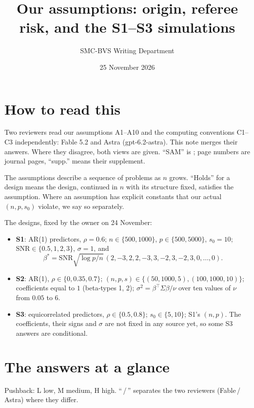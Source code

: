 \documentclass[11pt]{article}
\title{Our assumptions: origin, referee risk, and the S1--S3 simulations}
\author{SMC-BVS Writing Department}
\date{25 November 2026}
\newcommand{\sz}{s_0}
\begin{document}
\maketitle

\section*{How to read this}
Two reviewers read our assumptions A1--A10 and the computing conventions C1--C3 independently: Fable 5.2 and Astra
(gpt-6.2-astra). This note merges their answers. Where they disagree, both views are given. ``SAM'' is
\citet{SongLiang2015}; page numbers are journal pages, ``supp.'' means their supplement.

The assumptions describe a sequence of problems as $n$ grows. ``Holds'' for a design means the design, continued in $n$
with its structure fixed, satisfies the assumption. Where an assumption has explicit constants that our actual $(n,p,\sz)$
violate, we say so separately.

The designs, fixed by the owner on 24 November:
\begin{itemize}
  \item \textbf{S1}: AR(1) predictors, $\rho=0.6$; $n\in\{500,1000\}$, $p\in\{500,5000\}$, $\sz=10$;
    $\mathrm{SNR}\in\{0.5,1,2,3\}$, $\sigma=1$, and
    \[\beta^*=\mathrm{SNR}\sqrt{\log p/n}\,(2,-3,2,2,-3,3,-2,3,-2,3,0,\dots,0).\]
  \item \textbf{S2}: AR(1), $\rho\in\{0,0.35,0.7\}$; $(n,p,s)\in\{(50,1000,5),(100,1000,10)\}$; coefficients equal
    to $1$ (beta-types 1, 2); $\sigma^2=\beta^\top\Sigma\beta/\nu$ over ten values of $\nu$ from $0.05$ to $6$.
  \item \textbf{S3}: equicorrelated predictors, $\rho\in\{0.5,0.8\}$; $\sz\in\{5,10\}$; S1's $(n,p)$. The coefficients,
    their signs and $\sigma$ are not fixed in any source yet, so some S3 answers are conditional.
\end{itemize}

\section*{The answers at a glance}
Pushback: L low, M medium, H high. ``\,/\,'' separates the two reviewers (Fable\,/\,Astra) where they differ.
\end{document}
